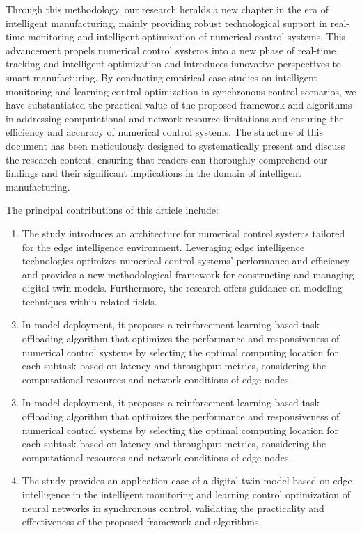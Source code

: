 \documentclass[preprint,12pt,authoryear]{elsarticle}
\begin{document}
Through this methodology, our research heralds a new chapter in the era of intelligent manufacturing, mainly providing robust technological support in real-time monitoring and intelligent optimization of numerical control systems.  This advancement propels numerical control systems into a new phase of real-time tracking and intelligent optimization and introduces innovative perspectives to smart manufacturing.  By conducting empirical case studies on intelligent monitoring and learning control optimization in synchronous control scenarios, we have substantiated the practical value of the proposed framework and algorithms in addressing computational and network resource limitations and ensuring the efficiency and accuracy of numerical control systems.  The structure of this document has been meticulously designed to systematically present and discuss the research content, ensuring that readers can thoroughly comprehend our findings and their significant implications in the domain of intelligent manufacturing.

The principal contributions of this article include:

\begin{enumerate}
    \item The study introduces an architecture for numerical control systems tailored for the edge intelligence environment. Leveraging edge intelligence technologies optimizes numerical control systems' performance and efficiency and provides a new methodological framework for constructing and managing digital twin models. Furthermore, the research offers guidance on modeling techniques within related fields.

    \item  In model deployment, it proposes a reinforcement learning-based task offloading algorithm that optimizes the performance and responsiveness of numerical control systems by selecting the optimal computing location for each subtask based on latency and throughput metrics, considering the computational resources and network conditions of edge nodes.

    \item  In model deployment, it proposes a reinforcement learning-based task offloading algorithm that optimizes the performance and responsiveness of numerical control systems by selecting the optimal computing location for each subtask based on latency and throughput metrics, considering the computational resources and network conditions of edge nodes.

    \item The study provides an application case of a digital twin model based on edge intelligence in the intelligent monitoring and learning control optimization of neural networks in synchronous control, validating the practicality and effectiveness of the proposed framework and algorithms.
    
\end{enumerate}
\end{document}
